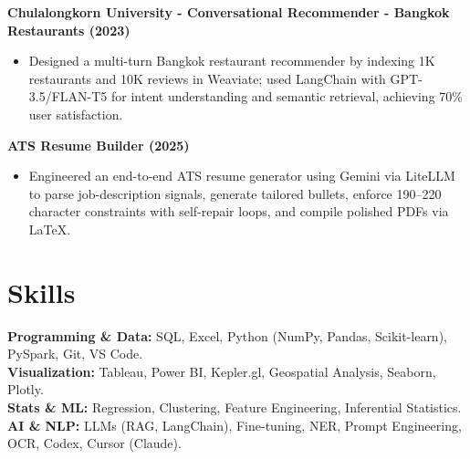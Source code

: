 \documentclass[a4paper,10pt]{article}
\begin{document}
\vspace{6pt}

\noindent \textbf{Chulalongkorn University - Conversational Recommender - Bangkok Restaurants (2023)}
\begin{itemize}
    \item Designed a multi-turn Bangkok restaurant recommender by indexing 1K restaurants and 10K reviews in Weaviate; used LangChain with GPT-3.5/FLAN-T5 for intent understanding and semantic retrieval, achieving 70\% user satisfaction.
\end{itemize}

\vspace{6pt}

\noindent \textbf{ATS Resume Builder (2025)}
\begin{itemize}
    \item Engineered an end-to-end ATS resume generator using Gemini via LiteLLM to parse job-description signals, generate tailored bullets, enforce 190--220 character constraints with self-repair loops, and compile polished PDFs via LaTeX.
\end{itemize}

\section{Skills}
\noindent \textbf{Programming \& Data:} SQL, Excel, Python (NumPy, Pandas, Scikit-learn), PySpark, Git, VS Code. \\
\textbf{Visualization:} Tableau, Power BI, Kepler.gl, Geospatial Analysis, Seaborn, Plotly. \\
\textbf{Stats \& ML:} Regression, Clustering, Feature Engineering, Inferential Statistics. \\
\textbf{AI \& NLP:} LLMs (RAG, LangChain), Fine-tuning, NER, Prompt Engineering, OCR, Codex, Cursor (Claude).
\end{document}
